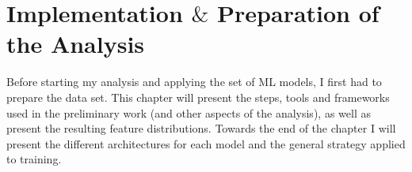 \chapter{Implementation $\&$ Preparation of the Analysis}\label{chap:Implementation}
Before starting my analysis and applying the set of \ac{ML} models, I first had to prepare the data set. This chapter 
will present the steps, tools and frameworks used in the preliminary work (and other aspects of the analysis), as well as present the 
resulting feature distributions. Towards the end of the chapter I will present the different architectures for each model and the general 
strategy applied to training.


